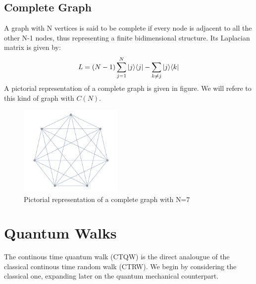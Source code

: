     \subsection{Complete Graph}\label{subsec:complete graph}
        A graph with N vertices is said to be complete if every node is adjacent to all the other N-1 nodes, thus representing a finite bidimensional structure. Its Laplacian matrix is given by:
        \begin{equation}
            L = (N-1)\sum_{j=1}^{N}{|{j}\rangle}{\langle{j}|} - \sum_{k\neq j}{|{j}\rangle}{\langle{k}|}
        \end{equation}
        A pictorial representation of a complete graph is given in figure. We will refere to this kind of graph with $C(N)$.
        \begin{figure}[hb]
          \centering
          \includegraphics[width=50mm]{./figures/chapter1/complete}
          \caption[Pictorial representation of a complete graph]{Pictorial representation of a complete graph with N=7}
        \end{figure}

\section{Quantum Walks}\label{sec:quantum walks}
The continous time quantum walk (CTQW) is the direct analougue of the classical continous time random walk (CTRW). We begin by considering the classical one, expanding later on the quantum mechanical counterpart. \nocite{Mulken2011} \\

